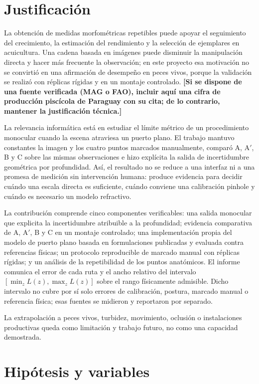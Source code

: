 \documentclass{report}
\newcommand{\Aprime}{A$'$}
\newcommand{\pend}[1]{\textbf{[#1]}}
\begin{document}
\section{Justificación}

La obtención de medidas morfométricas repetibles puede apoyar el seguimiento del crecimiento, la estimación del rendimiento y la selección de ejemplares en acuicultura. Una cadena basada en imágenes puede disminuir la manipulación directa y hacer más frecuente la observación; en este proyecto esa motivación no se convirtió en una afirmación de desempeño en peces vivos, porque la validación se realizó con réplicas rígidas y en un montaje controlado. \pend{Si se dispone de una fuente verificada (MAG o FAO), incluir aquí una cifra de producción piscícola de Paraguay con su cita; de lo contrario, mantener la justificación técnica.}

La relevancia informática está en estudiar el límite métrico de un procedimiento monocular cuando la escena atraviesa un puerto plano. El trabajo mantuvo constantes la imagen y los cuatro puntos marcados manualmente, comparó A, \Aprime, B y C sobre las mismas observaciones e hizo explícita la salida de incertidumbre geométrica por profundidad. Así, el resultado no se reduce a una interfaz ni a una promesa de medición sin intervención humana: produce evidencia para decidir cuándo una escala directa es suficiente, cuándo conviene una calibración pinhole y cuándo es necesario un modelo refractivo.

La contribución comprende cinco componentes verificables: una salida monocular que explicita la incertidumbre atribuible a la profundidad; evidencia comparativa de A, \Aprime, B y C en un montaje controlado; una implementación propia del modelo de puerto plano basada en formulaciones publicadas y evaluada contra referencias físicas; un protocolo reproducible de marcado manual con réplicas rígidas; y un análisis de la repetibilidad de los puntos anatómicos. El informe comunica el error de cada ruta y el ancho relativo del intervalo $[\min_z L(z), \max_z L(z)]$ sobre el rango físicamente admisible. Dicho intervalo no cubre por sí solo errores de calibración, postura, marcado manual o referencia física; esas fuentes se midieron y reportaron por separado.

La extrapolación a peces vivos, turbidez, movimiento, oclusión o instalaciones productivas queda como limitación y trabajo futuro, no como una capacidad demostrada.

\section{Hipótesis y variables}
\end{document}
